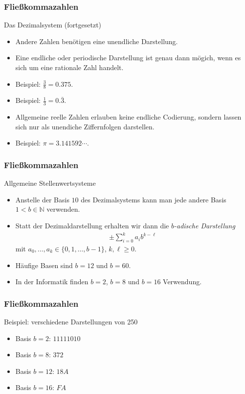 \documentclass{beamer}
\renewcommand{\emph}[1]{{\textcolor{solarizedRed}{\itshape #1}}}
\newcommand\NN{\mathbb N}
\newcommand{\mytitle}{Flie\ss kommazahlen}
\begin{document}
\begin{frame}\frametitle{\mytitle}
	\begin{block}{Das Dezimalsystem (fortgesetzt)}
		\begin{itemize}
			\item Andere Zahlen ben\"otigen eine unendliche Darstellung.
			\item Eine endliche oder \alert{periodische Darstellung} ist genau dann m\"ogich, wenn es sich um eine rationale Zahl handelt.
			\item \alert{Beispiel:} $\frac{3}{8}=0.375$.
			\item \alert{Beispiel:} $\frac{1}{3}=0.\bar 3$.
			\item Allgemeine reelle Zahlen erlauben keine endliche Codierung, sondern lassen sich nur als unendiche Ziffernfolgen darstellen.
			\item \alert{Beispiel:} $\pi=3.141592\cdots$.
		\end{itemize}
	\end{block}
\end{frame}

\begin{frame}\frametitle{\mytitle}
	\begin{block}{Allgemeine Stellenwertsysteme}
		\begin{itemize}
			\item Anstelle der Basis $10$ des Dezimalsystems kann man jede andere Basis $1<b\in\NN$ verwenden.
			\item Statt der Dezimaldarstellung erhalten wir dann die \emph{$b$-adische Darstellung} 
				\begin{align*}
					\pm\sum_{i=0}^ka_ib^{k-\ell}
				\end{align*}
				mit $a_0,\ldots,a_k\in\{0,1,\ldots,b-1\}$, $k,\ell\geq0$.
			\item H\"aufige Basen sind $b=12$ und $b=60$.
			\item In der Informatik finden $b=2$, $b=8$ und $b=16$ Verwendung.
		\end{itemize}
	\end{block}
\end{frame}

\begin{frame}\frametitle{\mytitle}
	\begin{block}{Beispiel: verschiedene Darstellungen von 250}
		\begin{itemize}
			\item \alert{Basis $b=2$:} $11111010$
			\item \alert{Basis $b=8$:} $372$
			\item \alert{Basis $b=12$:} $18A$
			\item \alert{Basis $b=16$:} $FA$
		\end{itemize}
	\end{block}
\end{frame}
\end{document}

